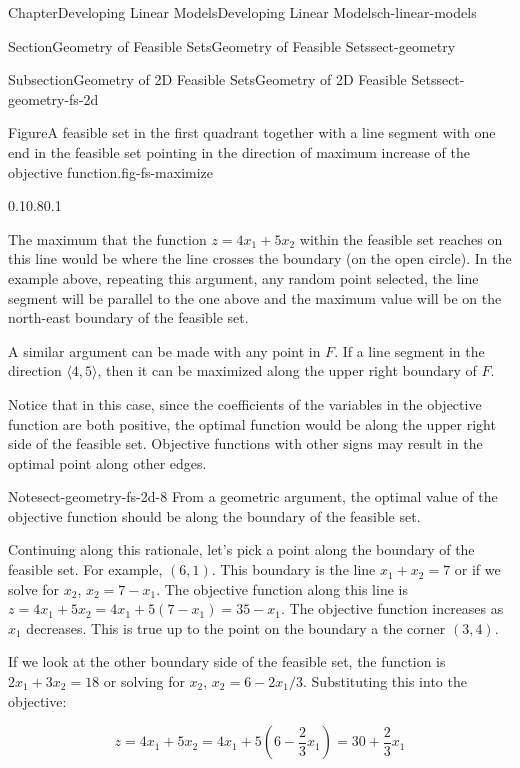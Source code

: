 \documentclass[oneside,10pt,]{book}
\numberwithin{equation}{section}
\begin{document}
\begin{chapterptx}{Chapter}{Developing Linear Models}{}{Developing Linear Models}{}{}{ch-linear-models}
\begin{sectionptx}{Section}{Geometry of Feasible Sets}{}{Geometry of Feasible Sets}{}{}{sect-geometry}
\begin{subsectionptx}{Subsection}{Geometry of 2D Feasible Sets}{}{Geometry of 2D Feasible Sets}{}{}{sect-geometry-fs-2d}
\begin{figureptx}{Figure}{A feasible set in the first quadrant together with a line segment with one end in the feasible set pointing in the direction of maximum increase of the objective function.}{fig-fs-maximize}{}
\begin{image}{0.1}{0.8}{0.1}{}
{%
}%
\end{image}%
\tcblower
\end{figureptx}%
The maximum that the function \(z=4x_1+5x_2\) within the feasible set reaches on this line would be where the line crosses the boundary (on the open circle). In the example above, repeating this argument, any random point selected, the line segment will be parallel to the one above and the maximum value will be on the north-east boundary of the feasible set.%
\par
A similar argument can be made with any point in \(F\). If a line segment in the direction \(\langle 4, 5 \rangle\), then it can be maximized along the upper right boundary of \(F\).%
\par
Notice that in this case, since the coefficients of the variables in the objective function are both positive, the optimal function would be along the upper right side of the feasible set. Objective functions with other signs may result in the optimal point along other edges.%
\begin{note}{Note}{}{sect-geometry-fs-2d-8}%
From a geometric argument, the optimal value of the objective function should be along the boundary of the feasible set.%
\end{note}
Continuing along this rationale, let's pick a point along the boundary of the feasible set. For example, \((6,1)\). This boundary is the line \(x_1+x_2=7\) or if we solve for \(x_2\), \(x_2 = 7 - x_1\). The objective function along this line is \(z=4x_1 + 5x_2 = 4x_1 + 5(7-x_1) = 35-x_1\). The objective function increases as \(x_1\) decreases. This is true up to the point on the boundary a the corner \((3,4)\).%
\par
If we look at the other boundary side of the feasible set, the function is \(2x_1+3x_2=18\) or solving for \(x_2\), \(x_2 = 6-2x_1/3\). Substituting this into the objective:%
\par
%
\begin{equation*}
z = 4x_1+5x_2 = 4x_1 + 5 \left(6-\frac{2}{3} x_1\right) = 30 +\frac{2}{3} x_1
\end{equation*}
%
\par

\end{subsectionptx}
\end{sectionptx}
\end{chapterptx}
\end{document}
